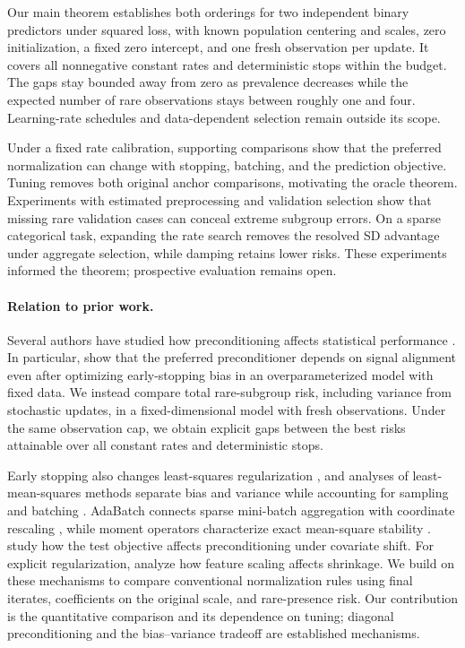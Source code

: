Our main theorem establishes both orderings for two independent binary
predictors under squared loss, with known population centering and scales, zero
initialization, a fixed zero intercept, and one fresh observation per update.
It covers all nonnegative constant rates and deterministic stops within the
budget. The gaps stay bounded away from zero as prevalence decreases while the
expected number of rare observations stays between roughly one and four.
Learning-rate schedules and data-dependent selection remain outside its scope.

Under a fixed rate calibration, supporting comparisons show that the preferred
normalization can change with stopping, batching, and the prediction objective.
Tuning removes both original anchor comparisons, motivating the oracle theorem.
Experiments with estimated preprocessing and validation selection show that
missing rare validation cases can conceal extreme subgroup errors. On a sparse
categorical task, expanding the rate search removes the resolved SD advantage
under aggregate selection, while damping retains lower risks. These experiments
informed the theorem; prospective evaluation remains open.

\paragraph{Relation to prior work.}

Several authors have studied how preconditioning affects statistical performance
\citep{amari2020preconditioning, su2024preconditioning}. In particular,
\citet[Section 4.2, Proposition 7]{amari2020preconditioning} show that the
preferred preconditioner depends on signal alignment even after optimizing
early-stopping bias in an overparameterized model with fixed data. We instead
compare total rare-subgroup risk, including variance from stochastic updates, in
a fixed-dimensional model with fresh observations. Under the same observation
cap, we obtain explicit gaps between the best risks attainable over all constant
rates and deterministic stops.

Early stopping also changes least-squares regularization \citep{ali2019early},
and analyses of least-mean-squares methods separate bias and variance while
accounting for sampling and batching \citep{defossez2015averaged,
jain2018parallelizing}. AdaBatch connects sparse mini-batch aggregation with
coordinate rescaling \citep{defossez2017adabatch}, while moment operators
characterize exact mean-square stability \citep{mulayoff2024exact}.
\citet{liu2025precondition} study how the test objective affects preconditioning
under covariate shift. For explicit regularization,
\citet{larsson2025normalization} analyze how feature scaling affects shrinkage.
We build on these mechanisms to compare conventional normalization rules using
final iterates, coefficients on the original scale, and rare-presence risk. Our
contribution is the quantitative comparison and its dependence on tuning;
diagonal preconditioning and the bias--variance tradeoff are established
mechanisms.
